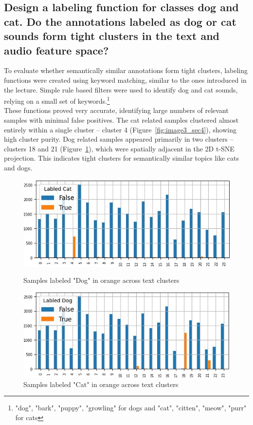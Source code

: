 \subsection{Design a labeling function for classes dog and cat. Do the annotations labeled as dog or cat sounds
form tight clusters in the text and audio feature space?}
\label{sec:Text Features:b}

To evaluate whether semantically similar annotations form tight clusters, labeling functions were created using keyword matching, similar to the ones introduced in the lecture. Simple rule based filters were used to identify dog and cat sounds, relying on a small set of keywords.\footnote{"dog", "bark", "puppy", "growling" for dogs and "cat", "citten", "meow", "purr" for cats}\\
These functions proved very accurate, identifying large numbers of relevant samples with minimal false positives. The cat related samples clustered almost entirely within a single cluster -- cluster 4 (Figure~\ref{fig:image3_sec4}), showing high cluster purity. Dog related samples appeared primarily in two clusters -- clusters 18 and 21 (Figure~\ref{fig:image4_sec4}), which were spatially adjacent in the 2D t-SNE projection. This indicates tight clusters for semantically similar topics like cats and dogs.
\begin{figure}[ht]
  \centering
  \begin{minipage}[b]{0.49\textwidth}
    \centering
    \includegraphics[width=\textwidth]{figs/cat_text_cluster.jpg}
    \caption{Samples labeled "Dog" in orange across text clusters}
    \label{fig:image3_sec4}
  \end{minipage}
  \hfill
  \begin{minipage}[b]{0.49\textwidth}
    \centering
    \includegraphics[width=\textwidth]{figs/dog_text_cluster.jpg}
    \caption{Samples labeled "Cat" in orange across text clusters}
    \label{fig:image4_sec4}
  \end{minipage}
\end{figure}


